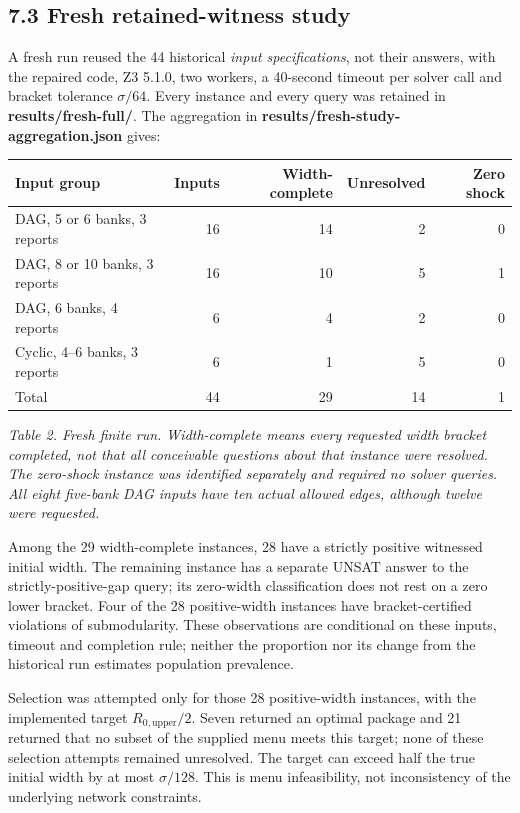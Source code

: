 \documentclass[
  british,
  11pt,
  a4paper,
]{article}
\newcounter{none} %
\begin{document}
\subsection{7.3 Fresh retained-witness
study}\label{fresh-retained-witness-study}

A fresh run reused the 44 historical \emph{input specifications}, not
their answers, with the repaired code, Z3 5.1.0, two workers, a
40-second timeout per solver call and bracket tolerance \(\sigma/64\).
Every instance and every query was retained in
\textbf{results/fresh-full/}. The aggregation in
\textbf{results/fresh-study-aggregation.json} gives:


{\def\LTcaptype{none} %
\begin{longtable}[]{@{}lrrrr@{}}
\toprule\noalign{}
Input group & Inputs & Width-complete & Unresolved & Zero shock \\
\midrule\noalign{}
\endhead
\bottomrule\noalign{}
\endlastfoot
DAG, 5 or 6 banks, 3 reports & 16 & 14 & 2 & 0 \\
DAG, 8 or 10 banks, 3 reports & 16 & 10 & 5 & 1 \\
DAG, 6 banks, 4 reports & 6 & 4 & 2 & 0 \\
Cyclic, 4--6 banks, 3 reports & 6 & 1 & 5 & 0 \\
Total & 44 & 29 & 14 & 1 \\
\end{longtable}
}

\emph{Table 2. Fresh finite run. Width-complete means every requested
width bracket completed, not that all conceivable questions about that
instance were resolved. The zero-shock instance was identified
separately and required no solver queries. All eight five-bank DAG
inputs have ten actual allowed edges, although twelve were requested.}

Among the 29 width-complete instances, 28 have a strictly positive
witnessed initial width. The remaining instance has a separate UNSAT
answer to the strictly-positive-gap query; its zero-width classification
does not rest on a zero lower bracket. Four of the 28 positive-width
instances have bracket-certified violations of submodularity. These
observations are conditional on these inputs, timeout and completion
rule; neither the proportion nor its change from the historical run
estimates population prevalence.

Selection was attempted only for those 28 positive-width instances, with
the implemented target \(R_{0,\mathrm{upper}}/2\). Seven returned an
optimal package and 21 returned that no subset of the supplied menu
meets this target; none of these selection attempts remained unresolved.
The target can exceed half the true initial width by at most
\(\sigma/128\). This is menu infeasibility, not inconsistency of the
underlying network constraints.
\end{document}
